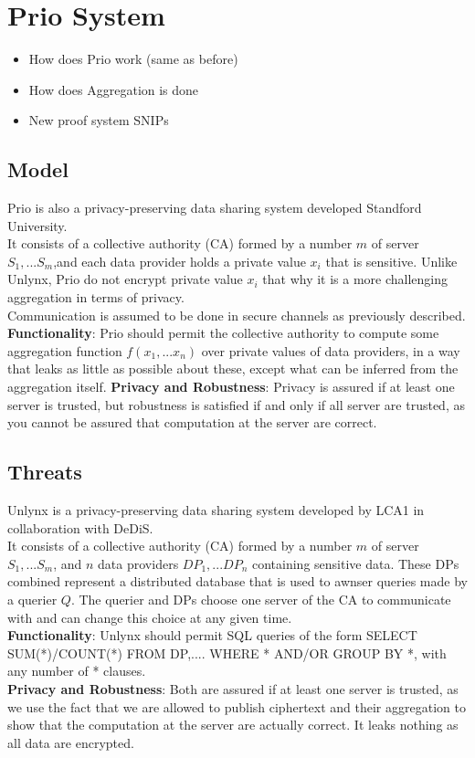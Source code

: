 \documentclass{article}
\begin{document}
\section{Prio System}
\begin{itemize}
\item How does Prio work (same as before)
\item How does Aggregation is done
\item New proof system SNIPs
\end{itemize}
\subsection{Model}
Prio is also a privacy-preserving data sharing system developed Standford University.\\
It consists of a collective authority (CA) formed by a number $m$ of server $S_1,...S_m$,and each data provider holds a private value $x_i$ that is sensitive. 
Unlike Unlynx, Prio do not encrypt private value $x_i$ that why it is a more challenging aggregation in terms of privacy.\\
Communication is assumed to be done in secure channels as previously described.
\textbf{Functionality}: Prio should permit the collective authority to compute some aggregation function $f(x_1,...x_n)$ over private values of data providers, in a way that leaks as little as possible about these, except what can be inferred from the aggregation itself.
\textbf{Privacy and Robustness}: Privacy is assured if at least one server is trusted, but robustness is satisfied if and only if all server are trusted, as you cannot be assured that computation at the server are correct.	
\
\subsection{Threats}
Unlynx is a privacy-preserving data sharing system developed by LCA1 in collaboration with DeDiS.\\
It consists of a collective authority (CA) formed by a number $m$ of server $S_1,...S_m$, and $n$ data providers $DP_1,...DP_n$ containing sensitive data. These DPs combined represent a distributed database that is used to awnser queries made by a querier $Q$. The querier and DPs choose one server of the CA to communicate with and can change this choice at any given time.\\
\textbf{Functionality}: Unlynx should permit SQL queries of the form SELECT SUM(*)/COUNT(*) FROM DP,.... WHERE * AND/OR GROUP BY *, with any number of * clauses.\\
\textbf{Privacy and Robustness}: Both are assured if at least one server is trusted, as we use the fact that we are allowed to publish ciphertext and their aggregation to show that the computation at the server are actually correct. It leaks nothing as all data are encrypted.
\end{document}
